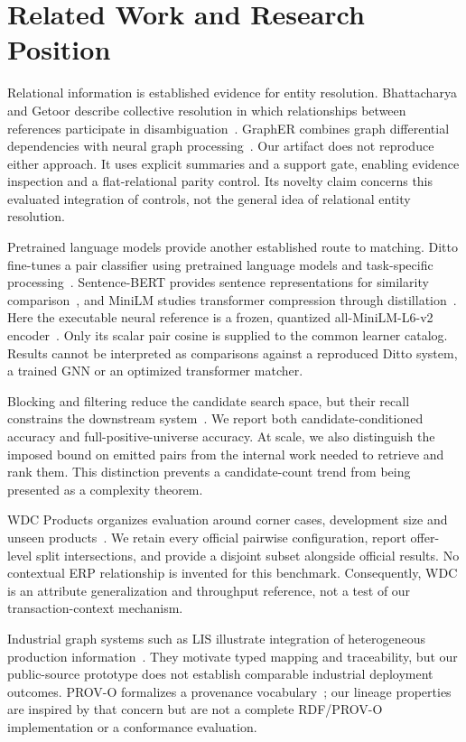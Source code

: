 \documentclass[11pt,letterpaper]{article}
\begin{document}
\section{Related Work and Research Position}
Relational information is established evidence for entity resolution. Bhattacharya and Getoor describe collective resolution in which relationships between references participate in disambiguation~\cite{collective}. GraphER combines graph differential dependencies with neural graph processing~\cite{grapher}. Our artifact does not reproduce either approach. It uses explicit summaries and a support gate, enabling evidence inspection and a flat-relational parity control. Its novelty claim concerns this evaluated integration of controls, not the general idea of relational entity resolution.

Pretrained language models provide another established route to matching. Ditto fine-tunes a pair classifier using pretrained language models and task-specific processing~\cite{ditto}. Sentence-BERT provides sentence representations for similarity comparison~\cite{sbert}, and MiniLM studies transformer compression through distillation~\cite{minilm}. Here the executable neural reference is a frozen, quantized all-MiniLM-L6-v2 encoder~\cite{modelcard}. Only its scalar pair cosine is supplied to the common learner catalog. Results cannot be interpreted as comparisons against a reproduced Ditto system, a trained GNN or an optimized transformer matcher.

Blocking and filtering reduce the candidate search space, but their recall constrains the downstream system~\cite{blocking}. We report both candidate-conditioned accuracy and full-positive-universe accuracy. At scale, we also distinguish the imposed bound on emitted pairs from the internal work needed to retrieve and rank them. This distinction prevents a candidate-count trend from being presented as a complexity theorem.

WDC Products organizes evaluation around corner cases, development size and unseen products~\cite{wdc}. We retain every official pairwise configuration, report offer-level split intersections, and provide a disjoint subset alongside official results. No contextual ERP relationship is invented for this benchmark. Consequently, WDC is an attribute generalization and throughput reference, not a test of our transaction-context mechanism.

Industrial graph systems such as LIS illustrate integration of heterogeneous production information~\cite{lis}. They motivate typed mapping and traceability, but our public-source prototype does not establish comparable industrial deployment outcomes. PROV-O formalizes a provenance vocabulary~\cite{prov}; our lineage properties are inspired by that concern but are not a complete RDF/PROV-O implementation or a conformance evaluation.
\end{document}
